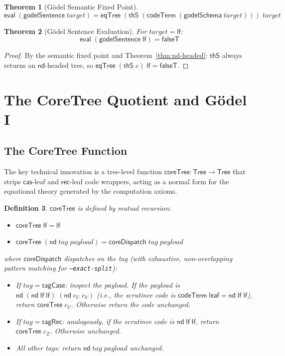 \documentclass[11pt]{article}
\newtheorem{theorem}{Theorem}
\newtheorem{definition}[theorem]{Definition}
\newcommand{\lf}{\mathsf{lf}}
\newcommand{\nd}{\mathsf{nd}}
\newcommand{\cas}{\mathsf{cas}}
\newcommand{\rec}{\mathsf{rec}}
\newcommand{\eval}{\mathsf{eval}}
\newcommand{\codeTerm}{\mathsf{codeTerm}}
\newcommand{\thS}{\mathsf{thS}}
\newcommand{\eqTree}{\mathsf{eqTree}}
\newcommand{\Tree}{\mathsf{Tree}}
\newcommand{\coreTree}{\mathsf{coreTree}}
\begin{document}
\begin{theorem}[G\"odel Semantic Fixed Point]
\[
  \eval\;(\mathsf{godelSentence}\;\mathit{target})
  = \eqTree\;(\thS\;(\codeTerm\;(\mathsf{godelSchema}\;\mathit{target})))\;\mathit{target}
\]
\end{theorem}

\begin{theorem}[G\"odel Sentence Evaluation]
For $\mathit{target} = \lf$:
\[
  \eval\;(\mathsf{godelSentence}\;\lf) = \mathsf{falseT}
\]
\end{theorem}
\begin{proof}
By the semantic fixed point and Theorem~\ref{thm:nd-headed}: $\thS$ always
returns an $\nd$-headed tree, so $\eqTree\;(\thS\;c)\;\lf = \mathsf{falseT}$.
\end{proof}

\section{The CoreTree Quotient and G\"odel I}

\subsection{The CoreTree Function}

The key technical innovation is a tree-level function $\coreTree : \Tree \to \Tree$
that strips $\cas$-leaf and $\rec$-leaf code wrappers, acting as a normal form
for the equational theory generated by the computation axioms.

\begin{definition}
$\coreTree$ is defined by mutual recursion:
\begin{itemize}
  \item $\coreTree\;\lf = \lf$
  \item $\coreTree\;(\nd\;\mathit{tag}\;\mathit{payload}) = \mathsf{coreDispatch}\;\mathit{tag}\;\mathit{payload}$
\end{itemize}
where $\mathsf{coreDispatch}$ dispatches on the tag (with exhaustive,
non-overlapping pattern matching for \texttt{--exact-split}):
\begin{itemize}
  \item If $\mathit{tag} = \mathsf{tagCase}$: inspect the payload.
    If the payload is $\nd\;(\nd\;\lf\;\lf)\;(\nd\;c_U\;c_V)$ (i.e., the
    scrutinee code is $\codeTerm\;\mathsf{leaf} = \nd\;\lf\;\lf$), return
    $\coreTree\;c_U$. Otherwise return the code unchanged.
  \item If $\mathit{tag} = \mathsf{tagRec}$: analogously, if the scrutinee
    code is $\nd\;\lf\;\lf$, return $\coreTree\;c_Z$. Otherwise unchanged.
  \item All other tags: return $\nd\;\mathit{tag}\;\mathit{payload}$ unchanged.
\end{itemize}
\end{definition}
\end{document}
